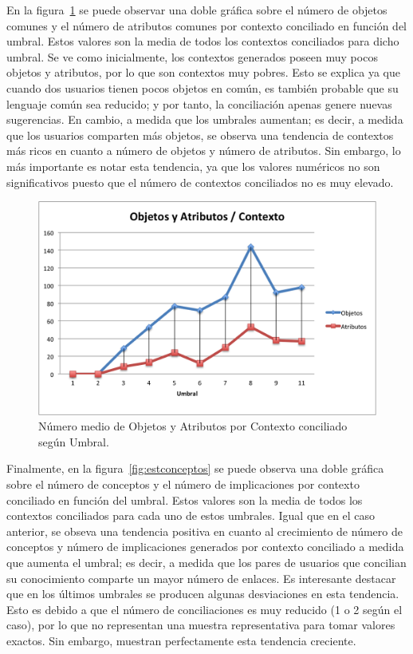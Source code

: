 En la figura~\ref{fig:estObj} se puede observar una doble gráfica sobre el número de objetos comunes y el número de atributos comunes por contexto conciliado en función del umbral. Estos valores son la media de todos los contextos conciliados para dicho umbral. Se ve como inicialmente, los contextos generados poseen muy pocos objetos y atributos, por lo que son contextos muy pobres. Esto se explica ya que cuando dos usuarios tienen pocos objetos en común, es también probable que su lenguaje común sea reducido; y por tanto, la conciliación apenas genere nuevas sugerencias. En cambio, a medida que los umbrales aumentan; es decir, a medida que los usuarios comparten más objetos, se observa una tendencia de contextos más ricos en cuanto a número de objetos y número de atributos. Sin embargo, lo más importante es notar esta tendencia, ya que los valores numéricos no son significativos puesto que el número de contextos conciliados no es muy elevado.

\begin{figure}
\centering
\includegraphics[scale=0.75]{img/7/est_nobj}
\caption{Número medio de Objetos y Atributos por Contexto conciliado según Umbral.
\label{fig:estObj}}
\end{figure}

Finalmente, en la figura~\ref{fig:estconceptos} se puede observa una doble gráfica sobre el número de conceptos y el número de implicaciones por contexto conciliado en función del umbral. Estos valores son la media de todos los contextos conciliados para cada uno de estos umbrales. Igual que en el caso anterior, se obseva una tendencia positiva en cuanto al crecimiento de número de conceptos y número de implicaciones generados por contexto conciliado a medida que aumenta el umbral; es decir, a medida que los pares de usuarios que concilian su conocimiento comparte un mayor número de enlaces. Es interesante destacar que en los últimos umbrales se producen algunas desviaciones en esta tendencia. Esto es debido a que el número de conciliaciones es muy reducido (1 o 2 según el caso), por lo que no representan una muestra representativa para tomar valores exactos. Sin embargo, muestran perfectamente esta tendencia creciente.

